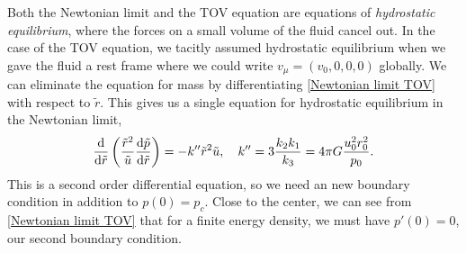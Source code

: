 Both the Newtonian limit and the TOV equation are equations of \emph{hydrostatic equilibrium}, where the forces on a small volume of the fluid cancel out.
In the case of the TOV equation, we tacitly assumed hydrostatic equilibrium when we gave the fluid a rest frame where we could write $v_\mu = (v_0, 0, 0, 0)$ globally.
We can eliminate the equation for mass by differentiating \autoref{Newtonian limit TOV} with respect to $\tilde r$.
This gives us a single equation for hydrostatic equilibrium in the Newtonian limit,
%
\begin{equation}
    \label{Newtonian limit TOV single equation}
    \odv{}{\tilde r} 
    \left( \frac{\tilde r^2}{\tilde u} \odv{\tilde p}{\tilde r}\right) 
    = -  k'' \tilde r^2  \tilde u, \quad
    k'' = 3 \frac{k_2 k_1}{k_3} = 4 \pi G \frac{u_0^2 r^2_0}{p_0}.
\end{equation}
%
This is a second order differential equation, so we need an new boundary condition in addition to $p(0) = p_c$.
Close to the center, we can see from \autoref{Newtonian limit TOV} that for a finite energy density, we must have $p'(0) = 0$, our second boundary condition.

